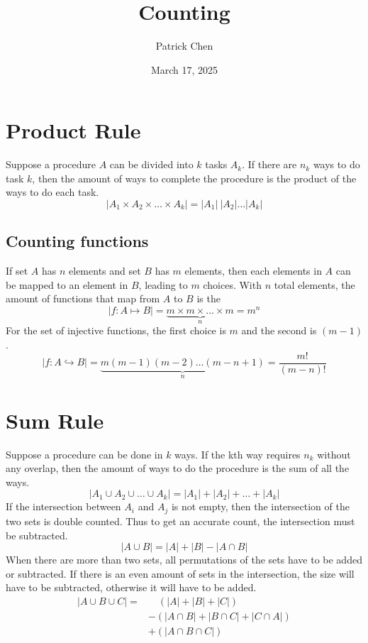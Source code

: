 \documentclass{article}
\title{Counting}
\author{Patrick Chen}
\date{March 17, 2025}
\theoremstyle{mytheoremstyle}
\theoremstyle{mytheoremstyle}
\theoremstyle{myproblemstyle}
\begin{document}
    \maketitle
    \section*{Product Rule}
    Suppose a procedure $A$ can be divided into $k$ tasks $A_k$. If there are
    $n_k$ ways to do task $k$, then the amount of ways to complete the procedure
    is the product of the ways to do each task.
    \[
        |A_1 \times A_2 \times \dots \times A_k| = |A_1|\ |A_2|\dots|A_k|
    \]

    \subsection*{Counting functions}
    If set $A$ has $n$ elements and set $B$ has $m$ elements, then each elements
    in $A$ can be mapped to an element in $B$, leading to $m$ choices. With $n$
    total elements, the amount of functions that map from $A$ to $B$ is the
    \[
        | f: A \mapsto B | = \underbrace{m\times m\times \dots\times m}_{n} = m^n
    \]
    For the set of injective functions, the first choice is $m$ and the second
    is $(m-1)$.
    \[
        | f: A \hookrightarrow B | = \underbrace{m(m-1)(m-2)\dots(m-n+1)}_n
        = \frac{m!}{(m-n)!}
    \]

    \section*{Sum Rule}
    Suppose a procedure can be done in $k$ ways. If the kth way requires $n_k$
    without any overlap, then the amount of ways to do the procedure is the sum
    of all the ways.
    \[
        | A_1 \cup A_2 \cup \dots \cup A_k | = |A_1|+|A_2|+\dots+|A_k|
    \]
    If the intersection between $A_i$ and $A_j$ is not empty, then the
    intersection of the two sets is double counted. Thus to get an accurate
    count, the intersection must be subtracted.
    \[
        |A \cup B| = |A| + |B| - |A\cap B|
    \]
    When there are more than two sets, all permutations of the sets have to be
    added or subtracted. If there is an even amount of sets in the intersection,
    the size will have to be subtracted, otherwise it will have to be added.
    \begin{align*}
        |A\cup B\cup C| = &\quad (|A| + |B| + |C|) \\
                        &- (|A\cap B| + |B\cap C| + |C\cap A|) \\
                        &+ (|A\cap B\cap C|)
    \end{align*}
\end{document}
